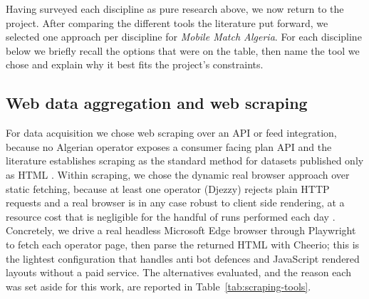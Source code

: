 Having surveyed each discipline as pure research above, we now return to the project. After comparing the different tools the literature put forward, we selected one approach per discipline for \textit{Mobile Match Algeria}. For each discipline below we briefly recall the options that were on the table, then name the tool we chose and explain why it best fits the project's constraints.

\subsection{Web data aggregation and web scraping}

For data acquisition we chose web scraping over an API or feed integration, because no Algerian operator exposes a consumer facing plan API and the literature establishes scraping as the standard method for datasets published only as HTML \parencite{BoegershausenDatta2022, GlezPena2014}. Within scraping, we chose the dynamic real browser approach over static fetching, because at least one operator (Djezzy) rejects plain HTTP requests and a real browser is in any case robust to client side rendering, at a resource cost that is negligible for the handful of runs performed each day \parencite{Mitchell2018, KahlonSingh2026}. Concretely, we drive a real headless Microsoft Edge browser through Playwright to fetch each operator page, then parse the returned HTML with Cheerio; this is the lightest configuration that handles anti bot defences and JavaScript rendered layouts without a paid service. The alternatives evaluated, and the reason each was set aside for this work, are reported in Table~\ref{tab:scraping-tools}.

